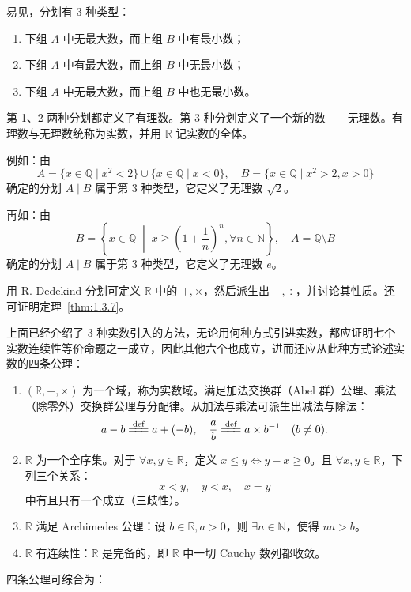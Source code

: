 易见，分划有 3 种类型：
\begin{enumerate}
  \item 下组 $A$ 中无最大数，而上组 $B$ 中有最小数；
  \item 下组 $A$ 中有最大数，而上组 $B$ 中无最小数；
  \item 下组 $A$ 中无最大数，而上组 $B$ 中也无最小数。
\end{enumerate}

第 1、2 两种分划都定义了有理数。第 3 种分划定义了一个新的数——无理数。有理数与无理数统称为实数，并用 $\mathbb{R}$ 记实数的全体。

例如：由
\[
A = \{x \in \mathbb{Q} \mid x^2 < 2\} \cup \{x \in \mathbb{Q} \mid x < 0\},\quad B = \{x \in \mathbb{Q} \mid x^2 > 2, x > 0\}
\]
确定的分划 $A \mid B$ 属于第 3 种类型，它定义了无理数 $\sqrt{2}$。

再如：由
\[
B = \left\{x \in \mathbb{Q} \;\middle|\; x \geqslant \left(1 + \frac{1}{n}\right)^n, \forall n \in \mathbb{N}\right\},\quad A = \mathbb{Q} \setminus B
\]
确定的分划 $A \mid B$ 属于第 3 种类型，它定义了无理数 $e$。

用 R. Dedekind 分划可定义 $\mathbb{R}$ 中的 $+ , \times$，然后派生出 $- , \div$，并讨论其性质。还可证明定理~\ref{thm:1.3.7}。

上面已经介绍了 3 种实数引入的方法，无论用何种方式引进实数，都应证明七个实数连续性等价命题之一成立，因此其他六个也成立，进而还应从此种方式论述实数的四条公理：

\begin{enumerate}
  \item $(\mathbb{R}, +, \times)$ 为一个域，称为实数域。满足加法交换群（Abel 群）公理、乘法（除零外）交换群公理与分配律。从加法与乘法可派生出减法与除法：
  \[
  a - b \xlongequal{\text{def}} a + (-b),\quad \frac{a}{b} \xlongequal{\text{def}} a \times b^{-1}\quad (b \neq 0).
\]
  \item $\mathbb{R}$ 为一个全序集。对于 $\forall x, y \in \mathbb{R}$，定义 $x \leqslant y \iff y - x \geqslant 0$。且 $\forall x, y \in \mathbb{R}$，下列三个关系：
  \[
  x < y,\quad y < x,\quad x = y
\]
  中有且只有一个成立（三歧性）。
  \item $\mathbb{R}$ 满足 Archimedes 公理：设 $b \in \mathbb{R}, a > 0$，则 $\exists n \in \mathbb{N}$，使得 $na > b$。
  \item $\mathbb{R}$ 有连续性：$\mathbb{R}$ 是完备的，即 $\mathbb{R}$ 中一切 Cauchy 数列都收敛。
\end{enumerate}

四条公理可综合为：

